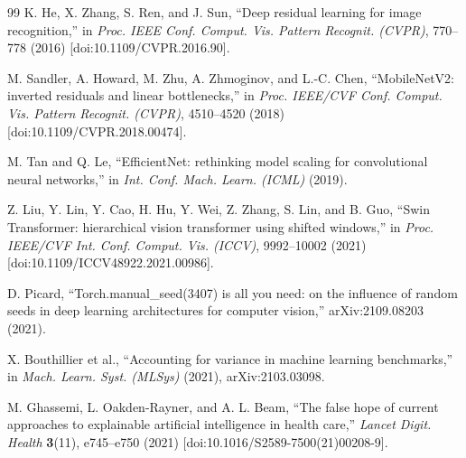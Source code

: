 \documentclass[12pt,letterpaper]{article}
\begin{document}
{\begin{thebibliography}{99}
K. He, X. Zhang, S. Ren, and J. Sun, ``Deep residual learning for image recognition,'' in \textit{Proc. IEEE Conf. Comput. Vis. Pattern Recognit. (CVPR)}, 770--778 (2016) [doi:10.1109/CVPR.2016.90].

M. Sandler, A. Howard, M. Zhu, A. Zhmoginov, and L.-C. Chen, ``MobileNetV2: inverted residuals and linear bottlenecks,'' in \textit{Proc. IEEE/CVF Conf. Comput. Vis. Pattern Recognit. (CVPR)}, 4510--4520 (2018) [doi:10.1109/CVPR.2018.00474].

M. Tan and Q. Le, ``EfficientNet: rethinking model scaling for convolutional neural networks,'' in \textit{Int. Conf. Mach. Learn. (ICML)} (2019).

Z. Liu, Y. Lin, Y. Cao, H. Hu, Y. Wei, Z. Zhang, S. Lin, and B. Guo, ``Swin Transformer: hierarchical vision transformer using shifted windows,'' in \textit{Proc. IEEE/CVF Int. Conf. Comput. Vis. (ICCV)}, 9992--10002 (2021) [doi:10.1109/ICCV48922.2021.00986].

D. Picard, ``Torch.manual\_seed(3407) is all you need: on the influence of random seeds in deep learning architectures for computer vision,'' arXiv:2109.08203 (2021).

X. Bouthillier et al., ``Accounting for variance in machine learning benchmarks,'' in \textit{Mach. Learn. Syst. (MLSys)} (2021), arXiv:2103.03098.

M. Ghassemi, L. Oakden-Rayner, and A. L. Beam, ``The false hope of current approaches to explainable artificial intelligence in health care,'' \textit{Lancet Digit. Health} \textbf{3}(11), e745--e750 (2021) [doi:10.1016/S2589-7500(21)00208-9].

\end{thebibliography}
}
\end{document}
